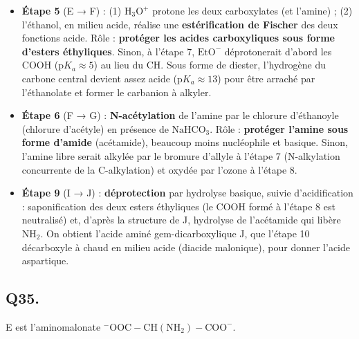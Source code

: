 \documentclass[11pt,a4paper]{article}
\providecommand{\tightlist}{\setlength{\itemsep}{0pt}\setlength{\parskip}{0pt}}
\begin{document}
\begin{itemize}
\tightlist
\item
  \textbf{Étape 5} (E → F) : (1) \(\mathrm{H_3O^+}\) protone les deux carboxylates (et l'amine) ; (2) l'éthanol, en milieu acide, réalise une \textbf{estérification de Fischer} des deux fonctions acide. Rôle : \textbf{protéger les acides carboxyliques sous forme d'esters éthyliques}. Sinon, à l'étape 7, \(\mathrm{EtO^-}\) déprotonerait d'abord les COOH (\(\mathrm{p}K_a\approx5\)) au lieu du CH. Sous forme de diester, l'hydrogène du carbone central devient assez acide (\(\mathrm{p}K_a\approx13\)) pour être arraché par l'éthanolate et former le carbanion à alkyler.
\item
  \textbf{Étape 6} (F → G) : \textbf{N-acétylation} de l'amine par le chlorure d'éthanoyle (chlorure d'acétyle) en présence de \(\mathrm{NaHCO_3}\). Rôle : \textbf{protéger l'amine sous forme d'amide} (acétamide), beaucoup moins nucléophile et basique. Sinon, l'amine libre serait alkylée par le bromure d'allyle à l'étape 7 (N-alkylation concurrente de la C-alkylation) et oxydée par l'ozone à l'étape 8.
\item
  \textbf{Étape 9} (I → J) : \textbf{déprotection} par hydrolyse basique, suivie d'acidification : saponification des deux esters éthyliques (le COOH formé à l'étape 8 est neutralisé) et, d'après la structure de J, hydrolyse de l'acétamide qui libère \(\mathrm{NH_2}\). On obtient l'acide aminé gem-dicarboxylique J, que l'étape 10 décarboxyle à chaud en milieu acide (diacide malonique), pour donner l'acide aspartique.
\end{itemize}

\hypertarget{q35.}{%
\subsection{Q35.}\label{q35.}}

E est l'aminomalonate \(\mathrm{^-OOC{-}CH(NH_2){-}COO^-}\).
\end{document}
